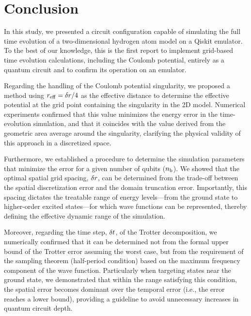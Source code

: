 \documentclass[letterpaper]{article}
\begin{document}



% 
% 


\section{Conclusion}
In this study, we presented a circuit configuration capable of simulating the
full time evolution of a two-dimensional hydrogen atom model on a Qiskit
emulator. To the best of our knowledge, this is the first report to implement
grid-based time evolution calculations, including the Coulomb potential,
entirely as a quantum circuit and to confirm its operation on an emulator.

Regarding the handling of the Coulomb potential singularity, we proposed a
method using $r_{\mathrm{eff}}=\delta r/4$ as the effective distance to determine the
effective potential at the grid point containing the singularity in the 2D
model. Numerical experiments confirmed that this value minimizes the
energy error in the time-evolution simulation, and that it coincides with
the value derived from the geometric area average around the singularity,
clarifying the physical validity of this approach in a discretized space.

Furthermore, we established a procedure to determine the simulation parameters
that minimize the error for a given number of qubits ($n_{\mathrm{b}}$). We showed that the
optimal spatial grid spacing, $\delta r$, can be determined from the trade-off
between the spatial discretization error and the domain truncation error.
Importantly, this spacing dictates the treatable range of
energy levels---from the ground state to higher-order excited states---for which
wave functions can be represented, thereby defining the effective dynamic range
of the simulation.

Moreover, regarding the time step, $\delta t$, of the Trotter decomposition, we
numerically confirmed that it can be determined not from the formal upper bound
of the Trotter error assuming the worst case, but from the requirement of the
sampling theorem (half-period condition) based on the maximum frequency
component of the wave function. Particularly when targeting states near the
ground state, we demonstrated that within the range satisfying this condition,
the spatial error becomes dominant over the temporal error (i.e., the error
reaches a lower bound), providing a guideline to avoid unnecessary increases in
quantum circuit depth.
\end{document}
